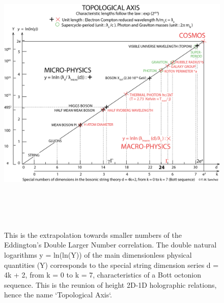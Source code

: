 \documentclass[a4paper,9pt]{article}
\begin{document}
\begin{appendix}
\begin{figure}
\label{tab:8:table8}
\centering
\includegraphics[width=\textwidth,height=14cm]{./figure/figure}
\caption[The Topological Axis]
{This is the extrapolation towards smaller numbers of the Eddington's Double Larger Number correlation. The double natural logarithms y = ln(ln(Y)) of the main dimensionless physical quantities (Y) corresponds to the special string dimension series d = 4k + 2, from k = 0 to k = 7, characteristics of a Bott octonion sequence. This is the reunion of height 2D-1D holographic relations, hence the name `Topological Axis`.}

\end{figure}
\end{appendix}
\end{document}
